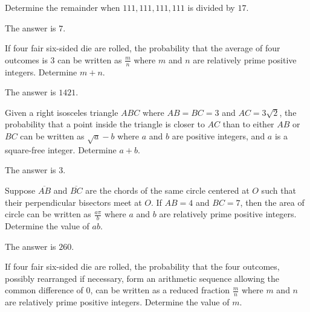 \begin{problem}
Determine the remainder when $111,111,111,111$ is divided by $17$.
\end{problem}

\begin{solution}
The answer is $7$.
\end{solution}

\begin{problem}
If four fair six-sided die are rolled, the probability that the average of four outcomes is $3$ can be written as $\frac{m}{n}$ where $m$ and $n$ are relatively prime positive integers. Determine $m+n$.
\end{problem}

\begin{solution}
The answer is $1421$.
\end{solution}

\begin{problem}
Given a right isosceles triangle $ABC$ where $AB=BC=3$ and $AC=3\sqrt{2}$, the probability that a point inside the triangle is closer to $AC$ than to either $AB$ or $BC$ can be written as $\sqrt{a}-b$ where $a$ and $b$ are positive integers, and $a$ is a square-free integer. Determine $a+b$.
\end{problem}

\begin{solution}
The answer is $3$.
\end{solution}

\begin{problem}
Suppose $\overline{AB}$ and $\overline{BC}$ are the chords of the same circle centered at $O$ such that their perpendicular bisectors meet at $O$. If $AB=4$ and $BC=7$, then the area of circle can be written as $\frac{a\pi}{b}$ where $a$ and $b$ are relatively prime positive integers. Determine the value of $ab$.
\end{problem}

\begin{solution}
The answer is $260$.
\end{solution}

\begin{problem}
If four fair six-sided die are rolled, the probability that the four outcomes, possibly rearranged if necessary, form an arithmetic sequence allowing the common difference of $0$, can be written as a reduced fraction $\frac{m}{n}$ where $m$ and $n$ are relatively prime positive integers. Determine the value of $m$.
\end{problem}

